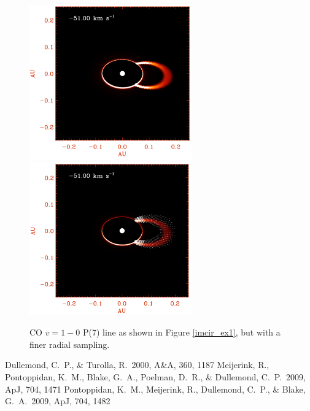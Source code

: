 \documentclass[11pt]{article}
\def\apj{ApJ}
\def\aap{A\&A}
\begin{document}
\begin{figure}
\centering
\includegraphics[width=7cm]{imcir_conv_ex3.pdf}
\includegraphics[width=7cm]{imcir_conv_ex4.pdf}
\caption{CO $v=1-0$ P(7) line as shown in Figure \ref{imcir_ex1}, but with a finer radial sampling.  }
\label{imcir_ex3}
\end{figure}

\begin{thebibliography}{}
\small
{} Dullemond, C.~P., \& Turolla, R.\ 2000, \aap, 360, 1187 
 Meijerink, R., 
Pontoppidan, K.~M., Blake, G.~A., Poelman, D.~R., 
\& Dullemond, C.~P.\ 2009, \apj, 704, 1471 
 Pontoppidan, K.~M., 
Meijerink, R., Dullemond, C.~P., \& Blake, G.~A.\ 2009, \apj, 704, 1482 



\end{thebibliography}
\end{document}
